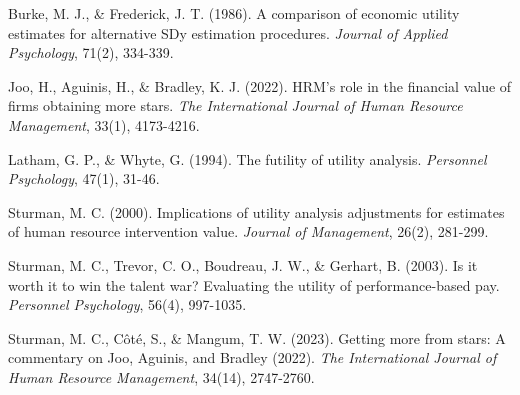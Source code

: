 \documentclass[
]{article}
\begin{document}
Burke, M. J., \& Frederick, J. T. (1986). A comparison of economic
utility estimates for alternative SDy estimation procedures.
\emph{Journal of Applied Psychology}, 71(2), 334-339.

Joo, H., Aguinis, H., \& Bradley, K. J. (2022). HRM's role in the
financial value of firms obtaining more stars. \emph{The International
Journal of Human Resource Management}, 33(1), 4173-4216.

Latham, G. P., \& Whyte, G. (1994). The futility of utility analysis.
\emph{Personnel Psychology}, 47(1), 31-46.

Sturman, M. C. (2000). Implications of utility analysis adjustments for
estimates of human resource intervention value. \emph{Journal of
Management}, 26(2), 281-299.

Sturman, M. C., Trevor, C. O., Boudreau, J. W., \& Gerhart, B. (2003).
Is it worth it to win the talent war? Evaluating the utility of
performance-based pay. \emph{Personnel Psychology}, 56(4), 997-1035.

Sturman, M. C., Côté, S., \& Mangum, T. W. (2023). Getting more from
stars: A commentary on Joo, Aguinis, and Bradley (2022). \emph{The
International Journal of Human Resource Management}, 34(14), 2747-2760.
\end{document}
